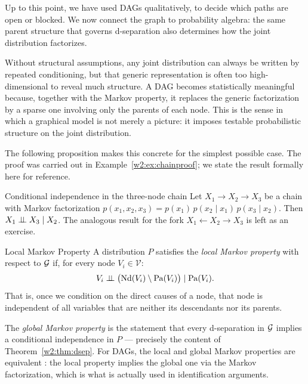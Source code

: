 \documentclass[master.tex]{subfiles}
\begin{document}
Up to this point, we have used DAGs qualitatively, to decide which paths
are open or blocked.
We now connect the graph to probability algebra: the same parent structure
that governs d-separation also determines how the joint distribution
factorizes.

Without structural assumptions, any joint distribution can always be
written by repeated conditioning, but that generic representation is
often too high-dimensional to reveal much structure.
A DAG becomes statistically meaningful because, together with the Markov
property, it replaces the generic factorization by a sparse one involving
only the parents of each node.
This is the sense in which a graphical model is not merely a picture: it
imposes testable probabilistic structure on the joint distribution.

The following proposition makes this concrete for the simplest possible
case.  The proof was carried out in Example~\ref{w2:ex:chainproof}; we
state the result formally here for reference.

\begin{prop}{Conditional independence in the three-node chain}
\label{w2:prop:chain}
Let $X_1 \to X_2 \to X_3$ be a chain with Markov factorization
$p(x_1, x_2, x_3) = p(x_1)\,p(x_2 \mid x_1)\,p(x_3 \mid x_2)$.
Then $X_1 \perp\!\!\!\perp X_3 \mid X_2$.
The analogous result for the fork $X_1 \leftarrow X_2 \to X_3$ is left
as an exercise.
\end{prop}

\begin{defn}{Local Markov Property}
A distribution $P$ satisfies the \emph{local Markov property} with respect
to $\mathcal{G}$ if, for every node $V_i \in \mathcal{V}$:
\[
  V_i \perp\!\!\!\perp \bigl(\mathrm{Nd}(V_i) \setminus \mathrm{Pa}(V_i)\bigr) \mid \mathrm{Pa}(V_i).
\]
That is, once we condition on the direct causes of a node, that node is
independent of all variables that are neither its descendants nor its parents.
\end{defn}

\begin{remark}
The \emph{global Markov property} is the statement that every
d-separation in $\mathcal{G}$ implies a conditional independence in $P$
--- precisely the content of Theorem~\ref{w2:thm:dsep}.
For DAGs, the local and global Markov properties are equivalent
\citep[][Proposition~3.27]{lauritzen1996graphical}: the local property
implies the global one via the Markov factorization, which is what is
actually used in identification arguments.
\end{remark}
\end{document}
